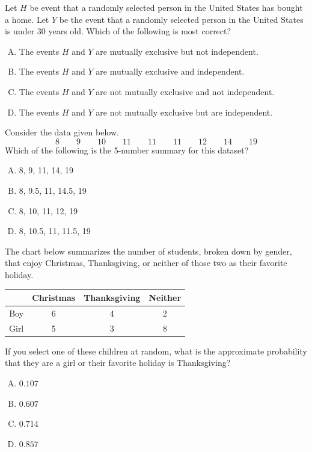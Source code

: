 \documentclass[12pt,letterpaper]{exam}
\begin{document}
\begin{questions}
\vfill

\question Let $H$ be event that a randomly selected person in the United States has bought a home. Let $Y$ be the event that a randomly selected person in the United States is under 30 years old. Which of the following is most correct?
	\begin{enumerate}[A.]
	\item The events $H$ and $Y$ are mutually exclusive but not independent. 
	\item The events $H$ and $Y$ are mutually exclusive and independent. 
	\item The events $H$ and $Y$ are not mutually exclusive and not independent. 
	\item The events $H$ and $Y$ are not mutually exclusive but are independent. 
	\end{enumerate}

\vfill

\question Consider the data given below.
	\[
	8 \qquad 9 \qquad 10 \qquad 11 \qquad 11 \qquad 11 \qquad 12 \qquad 14 \qquad 19
	\]
Which of the following is the 5-number summary for this dataset?
	\begin{enumerate}[A.]
	\item 8, 9, 11, 14, 19
	\item 8, 9.5, 11, 14.5, 19
	\item 8, 10, 11, 12, 19
	\item 8, 10.5, 11, 11.5, 19
	\end{enumerate}

\vfill

\question The chart below summarizes the number of students, broken down by gender, that enjoy Christmas, Thanksgiving, or neither of those two as their favorite holiday. \par
	\begin{table}[H]
	\centering
	\begin{tabular}{|c|c|c|c|} \hline
	& Christmas & Thanksgiving & Neither \\ \hline
	Boy & 6 & 4 & 2 \\ \hline
	Girl & 5 & 3 & 8 \\ \hline
	\end{tabular}
	\end{table} \par
If you select one of these children at random, what is the approximate probability that they are a girl or their favorite holiday is Thanksgiving?
	\begin{enumerate}[A.]
	\item $0.107$
	\item $0.607$
	\item $0.714$
	\item $0.857$
	\end{enumerate}


\end{questions}
\end{document}
